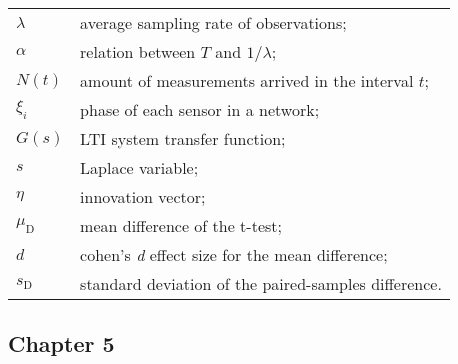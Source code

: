 \begin{longtable}{ll}
	$\lambda$				& average sampling rate of observations; \\
	$\alpha$				& relation between $T$ and $1/ \lambda$; \\
	
	$N(t)$					& amount of measurements arrived in the interval $t$; \\
	$\xi_i$					& phase of each sensor in a network; \\
	
	$G(s)$					& LTI system transfer function; \\
	$s$						& Laplace variable; \\
	
	$\eta$					& innovation vector; \\
	$\mu_{\textrm{D}}$		& mean difference of the t-test; \\
	$d$						& cohen's \textit{d} effect size for the mean difference; \\
	$s_{\textrm{D}}$		& standard deviation of the paired-samples difference. \\
	
\end{longtable}



\subsection*{Chapter 5}

